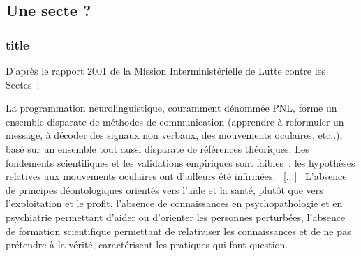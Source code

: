 \documentclass{beamer}
\begin{document}
\subsection{Une secte ?} %
\label{sub:une_secte}
\begin{frame}[t]\frametitle{title}
	D'après le rapport 2001 de la Mission Interministérielle de Lutte contre les Sectes~:
	\begin{cite}
	La programmation neurolinguistique, couramment dénommée PNL,
	forme un ensemble disparate de méthodes de communication
	(apprendre à reformuler un message, à décoder des signaux non verbaux,
	des mouvements oculaires, etc..),
	basé sur un ensemble tout aussi disparate de références théoriques.
	Les fondements scientifiques et les validations empiriques sont faibles~:
	les hypothèses relatives aux mouvements oculaires ont d'ailleurs été infirmées. \
	[...] \
	L'absence de principes déontologiques orientés vers l'aide et la santé,
	plutôt que vers l'exploitation et le profit,
	l'absence de connaissances en psychopathologie et en psychiatrie
	permettant d'aider ou d'orienter les personnes perturbées,
	l'absence de formation scientifique permettant de relativiser les connaissances
	et de ne pas prétendre à la vérité, caractérisent les pratiques qui font question.
	\end{cite}
\end{frame}
\end{document}
